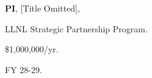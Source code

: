 \begin{innerlist}

  \item[] \textbf{PI},
  [Title Omitted],
  \begin{innerlist}
    \item[-] LLNL Strategic Partnership Program.
    \item[-] \$1,000,000/yr.
    \item[-] FY 28-29.
  \end{innerlist}

\end{innerlist}
